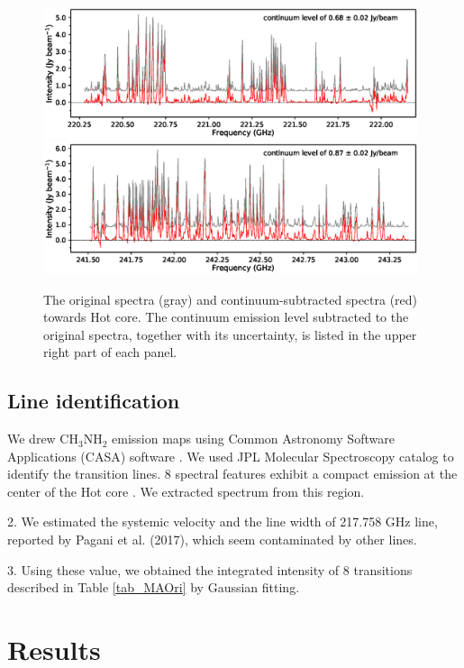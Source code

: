 \begin{figure}[H]
  \centering
  \includegraphics[width=0.98\textwidth]{OrionKL/spec_spw2.eps}
  \includegraphics[width=0.98\textwidth]{OrionKL/spec_spw13.eps}
  \caption{The original spectra (gray) and continuum-subtracted spectra (red) towards Hot core. 
  The continuum emission level subtracted to the original spectra, together with its uncertainty,
  is listed in the upper right part of each panel.}
  \label{SVspec}
\end{figure}



\subsection{Line identification}

We drew CH$_{3}$NH$_{2}$ emission maps using Common Astronomy Software Applications 
(CASA) software \citep{McMullin+2007}.
We used JPL Molecular Spectroscopy catalog to identify the transition lines. 
8 spectral features exhibit a compact emission at the center of the Hot core . 
We extracted spectrum from this region.

2. We estimated the systemic velocity and the line width of 217.758 GHz line, 
reported by Pagani et al. (2017), which seem contaminated by 
other lines.

3. Using these value, we obtained the integrated 
intensity of 8 transitions described in Table \ref{tab_MAOri} by Gaussian fitting.



\section{Results}
